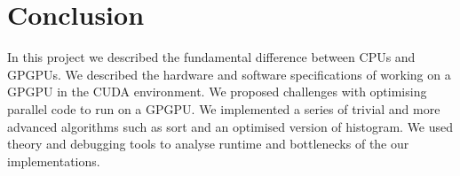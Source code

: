 \chapter{Conclusion}
\label{chap:conclusion}
In this project we described the fundamental difference between CPUs and GPGPUs.
We described the hardware and software specifications of working on a GPGPU in the CUDA environment.
We proposed challenges with optimising parallel code to run on a GPGPU.
We implemented a series of trivial and more advanced algorithms such as sort and an optimised version of histogram.
We used theory and debugging tools to analyse runtime and bottlenecks of the our implementations.
